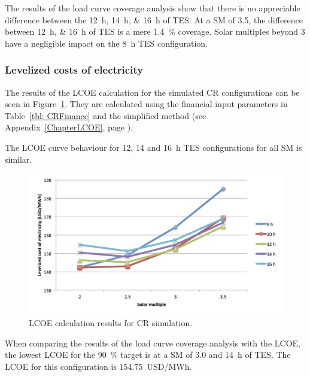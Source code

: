 The results of the load curve coverage analysis show that there is no appreciable difference between the \SIlist{12;14;16}{h} of TES. At a SM of 3.5, the difference between \SIlist{12;16}{h} of TES is a mere \SI{1.4}{\percent} coverage. Solar multiples beyond 3 have a negligible impact on the \SI{8}{h} TES configuration.

\subsubsection{Levelized costs of electricity}

The results of the LCOE calculation for the simulated CR configurations can be seen in Figure~\ref{CR_LCOE}. They are calculated using the financial input parameters in Table~\ref{tbl: CRFinance} and the simplified method (see Appendix~\ref{ChapterLCOE}, page \pageref{ChapterLCOE}). 

The LCOE curve behaviour for 12, 14 and \SI{16}{h} TES configurations for all SM is similar.

\begin{figure}[htbp]  
\centering
\includegraphics[width=1\linewidth]{FIG/CR_LCOE}
\caption[LCOE calculation results for CR simulation.]{LCOE calculation results for CR simulation.}\label{CR_LCOE}
\end{figure}

When comparing the results of the load curve coverage analysis with the LCOE, the lowest LCOE for the \SI{90}{\percent} target is at a SM of 3.0 and \SI{14}{h} of TES. The LCOE for this configuration is \SI{154.75}{USD/MWh}.

